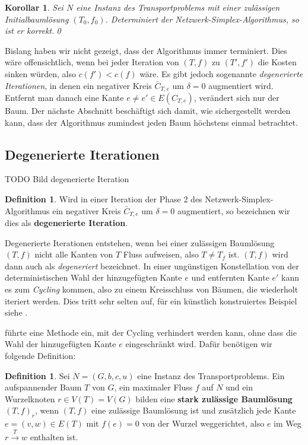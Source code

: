 \documentclass[a4paper,twoside,ngerman]{report}
\theoremstyle{plain}
\newtheorem{kor}[thm]{Korollar}
\theoremstyle{definition}
\newtheorem{defn}[thm]{Definition}
\begin{document}
\begin{kor}\label{korrekt}Sei $N$ eine Instanz des Transportproblems mit einer zulässigen Initialbaumlösung $(T_0,f_0)$. Determiniert der Netzwerk-Simplex-Algorithmus, so ist er korrekt.\qed\end{kor}

Bislang haben wir nicht gezeigt, dass der Algorithmus immer terminiert. Dies wäre offensichtlich, wenn bei jeder Iteration von $(T,f)$ zu $(T',f')$ die Kosten sinken würden, also $c(f')<c(f)$ wäre. Es gibt jedoch sogenannte \emph{degenerierte Iterationen}, in denen ein negativer Kreis $\bar{C}_{T,e}$ um $\delta=0$ augmentiert wird. Entfernt man danach eine Kante $e\neq e'\in E(C_{T,e})$, verändert sich nur der Baum. Der nächste Abschnitt beschäftigt sich damit, wie sichergestellt werden kann, dass der Algorithmus zumindest jeden Baum höchstens einmal betrachtet.

\subsection{Degenerierte Iterationen}\label{ch:deg}
TODO Bild degenerierte Iteration

\begin{defn}Wird in einer Iteration der Phase 2 des Netzwerk-Simplex-Algorithmus ein negativer Kreis $\bar{C}_{T,e}$ um $\delta=0$ augmentiert, so bezeichnen wir dies als \textbf{degenerierte Iteration}.
\end{defn}

Degenerierte Iterationen entstehen, wenn bei einer zulässigen Baumlösung $(T,f)$ nicht alle Kanten von $T$ Fluss aufweisen, also $T\neq T_f$ ist. $(T,f)$ wird dann auch als \emph{degeneriert} bezeichnet. In einer ungünstigen Konstellation von der deterministischen Wahl der hinzugefügten Kante $e$ und entfernten Kante $e'$ kann es zum \emph{Cycling} kommen, also zu einem Kreisschluss von Bäumen, die wiederholt iteriert werden. Dies tritt sehr selten auf, für ein künstlich konstruiertes Beispiel siehe \cite[S. 303]{NSAbook}.

\cite[Cunningham, 1976]{cycling} führte eine Methode ein, mit der Cycling verhindert werden kann, ohne dass die Wahl der hinzugefügten Kante $e$ eingeschränkt wird. Dafür benötigen wir folgende Definition:

\begin{defn}Sei $N=(G,b,c,u)$ eine Instanz des Transportproblems. Ein aufspannender Baum $T$ von $G$, ein maximaler Fluss $f$ auf $N$ und ein Wurzelknoten $r\in V(T)=V(G)$ bilden eine \textbf{stark zulässige Baumlösung} $(T,f)_r$, wenn $(T,f)$ eine zulässige Baumlösung ist und zusätzlich jede Kante $e=(v,w)\in E(T)$ mit $f(e)=0$ von der Wurzel weggerichtet, also $e$ im Weg $r\xrightarrow{T}w$ enthalten ist.\end{defn}
\end{document}
